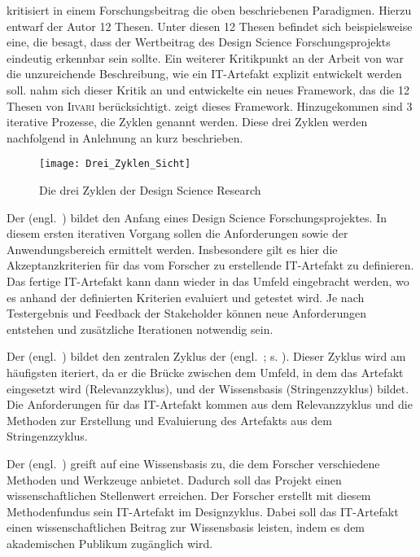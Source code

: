 \textcite{Iivari2007} kritisiert in einem Forschungsbeitrag die oben beschriebenen Paradigmen.
Hierzu entwarf der Autor 12 Thesen. Unter diesen 12 Thesen befindet sich beispielsweise
eine, die besagt, dass der Wertbeitrag des Design Science Forschungsprojekts eindeutig
erkennbar sein sollte. Ein weiterer Kritikpunkt an der Arbeit von \textcite{Hevneretal2004} war die
unzureichende Beschreibung, wie ein IT-Artefakt explizit entwickelt werden soll. 
\textcite{Hevner2007} nahm sich dieser Kritik an 
und entwickelte ein neues Framework, das die 12 Thesen von \textsc{Iivari} berücksichtigt.
 zeigt dieses Framework. Hinzugekommen sind 3 iterative Prozesse,
die Zyklen genannt werden. Diese drei Zyklen werden nachfolgend in Anlehnung an \textcite{Hevner2007}
kurz beschrieben.
%
\begin{figure}[H]
\label{fig:ThreeCycleView}
\begin{center}
\texttt{[image: Drei\_Zyklen\_Sicht]} %
\end{center}
\caption{Die drei Zyklen der Design Science Research
  \parencite[eigene Darstellung mit Übersezung in Anlehnung an][]{Hevner2007}}
\end{figure}
%
Der  (engl.~) bildet den Anfang eines 
Design Science Forschungsprojektes. In
diesem ersten iterativen Vorgang sollen die Anforderungen sowie der
Anwendungsbereich ermittelt werden. Insbesondere gilt es hier die Akzeptanzkriterien
für das vom Forscher zu erstellende IT-Artefakt zu definieren. Das fertige IT-Artefakt
kann dann wieder in das Umfeld eingebracht werden, wo es
anhand der definierten Kriterien evaluiert und getestet wird. Je nach Testergebnis und Feedback der
Stakeholder können neue Anforderungen entstehen und zusätzliche Iterationen
notwendig sein.

Der  (engl.~) bildet den zentralen Zyklus 
der  (engl.~; s. ).
Dieser Zyklus wird am häufigsten iteriert, da er die Brücke zwischen dem Umfeld, in dem
das Artefakt eingesetzt wird (Relevanzzyklus), und der Wissensbasis
(Stringenzzyklus) bildet. Die Anforderungen für das IT-Artefakt kommen aus dem
Relevanzzyklus und die Methoden zur Erstellung und Evaluierung des Artefakts aus dem
Stringenzzyklus.

Der  (engl.~) greift auf eine Wissensbasis
zu, die dem Forscher
verschiedene Methoden und Werkzeuge anbietet. Dadurch soll das Projekt
einen wissenschaftlichen Stellenwert erreichen. Der Forscher erstellt mit diesem
Methodenfundus sein IT-Artefakt im Designzyklus. Dabei soll das IT-Artefakt einen
wissenschaftlichen Beitrag zur Wissensbasis leisten, indem es dem akademischen
Publikum zugänglich wird.

